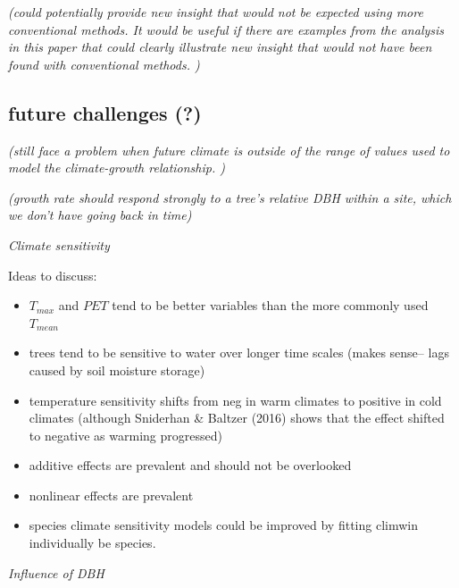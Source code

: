 \documentclass[
]{article}
\begin{document}
\emph{(could potentially provide new insight that would not be expected
using more conventional methods. It would be useful if there are
examples from the analysis in this paper that could clearly illustrate
new insight that would not have been found with conventional methods. )}

\hypertarget{future-challenges}{%
\subsection{future challenges (?)}\label{future-challenges}}

\emph{(still face a problem when future climate is outside of the range
of values used to model the climate-growth relationship. )}

\emph{(growth rate should respond strongly to a tree's relative DBH
within a site, which we don't have going back in time)}

\emph{Climate sensitivity}

Ideas to discuss:

\begin{itemize}
\item
  \(T_{max}\) and \(PET\) tend to be better variables than the more
  commonly used \(T_{mean}\)
\item
  trees tend to be sensitive to water over longer time scales (makes
  sense-- lags caused by soil moisture storage)
\item
  temperature sensitivity shifts from neg in warm climates to positive
  in cold climates (although Sniderhan \& Baltzer (2016) shows that the
  effect shifted to negative as warming progressed)
\item
  additive effects are prevalent and should not be overlooked
\item
  nonlinear effects are prevalent
\item
  species climate sensitivity models could be improved by fitting
  climwin individually be species.
\end{itemize}

\emph{Influence of DBH}
\end{document}
